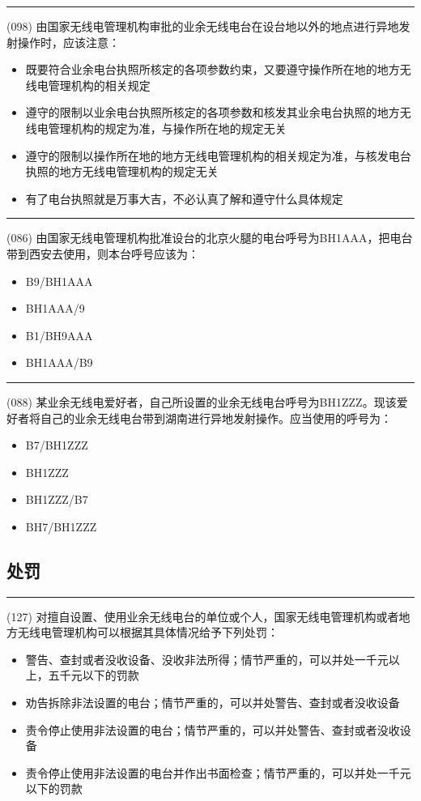 \documentclass[twocolumn,hyperref,UTF8]{ctexart}  %
\begin{document}
\noindent\rule{0.5\textwidth}{1pt}
\heiti (098) 由国家无线电管理机构审批的业余无线电台在设台地以外的地点进行异地发射操作时，应该注意： \songti {\color{gray} [LK0062] }
\begin{itemize}
	\item  既要符合业余电台执照所核定的各项参数约束，又要遵守操作所在地的地方无线电管理机构的相关规定
	\item  遵守的限制以业余电台执照所核定的各项参数和核发其业余电台执照的地方无线电管理机构的规定为准，与操作所在地的规定无关
	\item  遵守的限制以操作所在地的地方无线电管理机构的相关规定为准，与核发电台执照的地方无线电管理机构的规定无关
	\item  有了电台执照就是万事大吉，不必认真了解和遵守什么具体规定
\end{itemize}


\noindent\rule{0.5\textwidth}{1pt}
\heiti (086) 由国家无线电管理机构批准设台的北京火腿的电台呼号为BH1AAA，把{\color{cyan}电台带到}西安去使用，则本台呼号应该为： \songti {\color{gray} [LK0079] }
\begin{itemize}
	\item  B9/BH1AAA
	\item  BH1AAA/9
	\item  B1/BH9AAA
	\item  BH1AAA/B9
\end{itemize}


\noindent\rule{0.5\textwidth}{1pt}
\heiti (088) 某业余无线电爱好者，自己所设置的业余无线电台呼号为BH1ZZZ。现该爱好者将自己的业余无线{\color{cyan}电台带到}湖南进行异地发射操作。应当使用的呼号为： \songti {\color{gray} [LK0086] }
\begin{itemize}
	\item  B7/BH1ZZZ
	\item  BH1ZZZ
	\item  BH1ZZZ/B7
	\item  BH7/BH1ZZZ
\end{itemize}





\clearpage
\subsection{处罚}


\noindent\rule{0.5\textwidth}{1pt}
\heiti (127) 对擅自设置、使用业余无线电台的单位或个人，国家无线电管理机构或者地方无线电管理机构可以根据其具体情况给予下列处罚： \songti {\color{gray} [LK0094] }
\begin{itemize}
	\item  警告、查封或者没收设备、没收非法所得；情节严重的，可以并处一千元以上，五千元以下的罚款
	\item  劝告拆除非法设置的电台；情节严重的，可以并处警告、查封或者没收设备
	\item  责令停止使用非法设置的电台；情节严重的，可以并处警告、查封或者没收设备
	\item  责令停止使用非法设置的电台并作出书面检查；情节严重的，可以并处一千元以下的罚款
\end{itemize}
\end{document}
